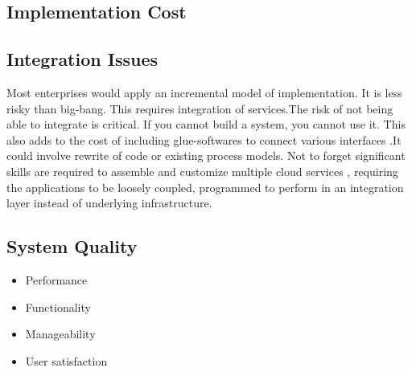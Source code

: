 \subsection{Implementation Cost}  

\subsection{Integration Issues} 
Most enterprises would apply an incremental model of implementation. It is less risky than big-bang. This requires integration of services.The risk of not being able to integrate is critical. If you cannot build a system, you cannot use it. This also adds to the cost of including glue-softwares to connect various interfaces .It could involve rewrite of code or existing process models. Not to forget significant skills are required to assemble and customize multiple cloud services , requiring the applications to be loosely coupled, programmed to perform in an integration layer instead of underlying infrastructure.  

\subsection{System Quality}  
\begin{itemize}
	\item Performance 
	\item Functionality 
	\item Manageability 
	\item User satisfaction 
\end{itemize}
